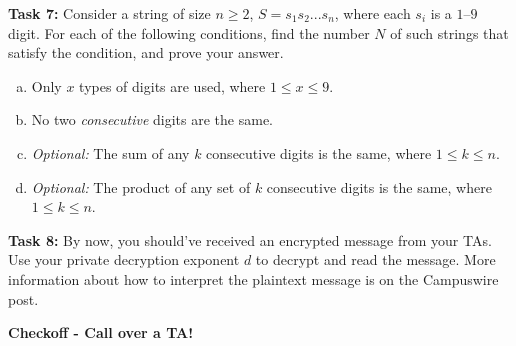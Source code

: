 \documentclass[12pt,letterpaper]{article}
\newif\ifsol
\newcommand{\solu}[2]{ \begin{mdframed} \ifsol #2 \else \vspace{#1} \fi \end{mdframed} }
\begin{document}
\textbf{Task 7: }Consider a string of size $n \geq 2$, $S = s_1s_2...s_n$, where each $s_i$ is a $1$--$9$ digit. For each of the following conditions, find the number $N$ of such strings that satisfy the condition, and prove your answer.
\begin{enumerate}[a.]
    \item Only $x$ types of digits are used, where $1 \leq x \leq 9$.
    \solu{1cm}{There are $n$ digits, each of which has $x$ options, meaning there are $x^n$ possibilities.}
    \item No two \textit{consecutive} digits are the same.
    \solu{1cm}{The first digit has $9$ options. The remaining digits have $8$ options since they cannot match the preceeding digits. Thus, there are $9\cdot 8^{n-1}$.}
    \item \textit{Optional: }The sum of any $k$ consecutive digits is the same, where $1 \leq k \leq n$.
    \solu{2cm}{Consider some arbitrary sequence of $k$ digits of the number $s_is_{i+1}...s_{i+k-1}$ with sum $r$. Now, if we move on to the next $k$ digits with $s_2$ at the front, we seek the sum of $s_{i+1}s_{i+2}...s_{i+k}$. We know that each $k$ group must have the same sum, $r$, so
    \begin{equation*}
        s_{i+1}+s_{i+2}+...+s_{i+k}=r
    \end{equation*}
    But we know from the first $k$ digits that
    \begin{equation*}
        r-s_i+s_{i+k}=r
    \end{equation*}
    which implies that $s_{k+i}=s_i$. This means that, for all $k$-sequences to have the same sum, a particular $k$ sequence must be cycled through in order. This implies that counting the number of $k$ sequences possible is sufficient. Since there are $k$ digits to choose, there are $9^k$ such options.}
    \item \textit{Optional: }The product of any set of $k$ consecutive digits is the same, where $1 \leq k \leq n$.
    \solu{2cm}{The argument is the same as above. The only step that changes is
    \begin{equation*}
        s_{i+k}r/s_i=r
    \end{equation*}
    which still implies that $s_{k+i}=s_i$. There are similarly $9^k$ options.}
\end{enumerate}

\textbf{Task 8:} By now, you should've received an encrypted message from your TAs. Use your private decryption exponent $d$ to decrypt and read the message. More information about how to interpret the plaintext message is on the Campuswire post.

\solu{2cm}{Our default message was 1309121125230125, "MILKYWAY". More creative TAs may have sent you a different message.}

\textbf{Checkoff - Call over a TA!}
\end{document}
